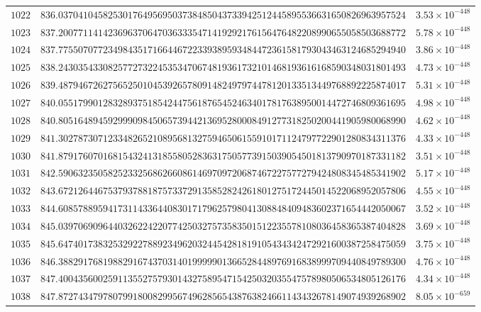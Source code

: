 \documentclass[12pt,reqno]{amsart}
\theoremstyle{remark}
\begin{document}
\begin{longtable}{clc}
$1022$ & $836.0370410458253017649569503738485043733942512445895536631650826963957524$ & $3.53\times 10^{-448}$ \\
$1023$ & $837.2007711414236963706470363335471419292176156476482208990655058503688772$ & $5.78\times 10^{-448}$ \\
$1024$ & $837.7755070772349843517166446722339389593484472361581793043463124685294940$ & $3.86\times 10^{-448}$ \\
$1025$ & $838.2430354330825772732245353470674819361732101468193616168590348031801493$ & $4.73\times 10^{-448}$ \\
$1026$ & $839.4879467262756525010453926578091482497974478120133513449768892225874017$ & $5.31\times 10^{-448}$ \\
$1027$ & $840.0551799012832893751854244756187654524634017817638950014472746809361695$ & $4.98\times 10^{-448}$ \\
$1028$ & $840.8051648945929990984506573944213695280008491277318250200441905980068990$ & $4.62\times 10^{-448}$ \\
$1029$ & $841.3027873071233482652108956813275946506155910171124797722901280834311376$ & $4.33\times 10^{-448}$ \\
$1030$ & $841.8791760701681543241318558052836317505773915039054501813790970187331182$ & $3.51\times 10^{-448}$ \\
$1031$ & $842.5906323505825233256862660861469709720687467227577279424808345485341902$ & $5.17\times 10^{-448}$ \\
$1032$ & $843.6721264467537937881875733729135852824261801275172445014522068952057806$ & $4.55\times 10^{-448}$ \\
$1033$ & $844.6085788959417311433644083017179625798041308848409483602371654442050067$ & $3.52\times 10^{-448}$ \\
$1034$ & $845.0397069096440326224220774250327573583501512235578108036458365387404828$ & $3.69\times 10^{-448}$ \\
$1035$ & $845.6474017383253292278892349620324454281819105434342472921600387258475059$ & $3.75\times 10^{-448}$ \\
$1036$ & $846.3882917681988291674370314019999901366528448976916838999709440849789300$ & $4.76\times 10^{-448}$ \\
$1037$ & $847.4004356002591135527579301432758954715425032035547578980506534805126176$ & $4.34\times 10^{-448}$ \\
$1038$ & $847.8727434797807991800829956749628565438763824661143432678149074939268902$ & $8.05\times 10^{-659}$ \\
\end{longtable}
\normalsize
\setlength{\LTleft}{0pt}
\setlength{\LTright}{0pt}
\end{document}
